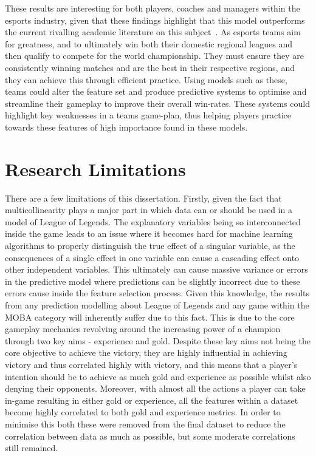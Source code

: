 These results are interesting for both players, coaches and managers within the esports industry, given that these findings highlight that this model outperforms the current rivalling academic literature on this subject~\citep{lee2020predicting, silva2018continuous}.
As esports teams aim for greatness, and to ultimately win both their domestic regional leagues and then qualify to compete for the world championship.
They must ensure they are consistently winning matches and are the best in their respective regions, and they can achieve this through efficient practice.
Using models such as these, teams could alter the feature set and produce predictive systems to optimise and streamline their gameplay to improve their overall win-rates.
These systems could highlight key weaknesses in a teams game-plan, thus helping players practice towards these features of high importance found in these models.

\section{Research Limitations}\label{sec:Research Limitations}

There are a few limitations of this dissertation.
Firstly, given the fact that multicollinearity plays a major part in which data can or should be used in a model of League of Legends.
The explanatory variables being so interconnected inside the game leads to an issue where it becomes hard for machine learning algorithms to properly distinguish the true effect of a singular variable, as the consequences of a single effect in one variable can cause a cascading effect onto other independent variables.
This ultimately can cause massive variance or errors in the predictive model where predictions can be slightly incorrect due to these errors cause inside the feature selection process.
Given this knowledge, the results from any prediction modelling about League of Legends and any game within the MOBA category will inherently suffer due to this fact.
This is due to the core gameplay mechanics revolving around the increasing power of a champion through two key aims - experience and gold.
Despite these key aims not being the core objective to achieve the victory, they are highly influential in achieving victory and thus correlated highly with victory, and this means that a player's intention should be to achieve as much gold and experience as possible whilst also denying their opponents.
Moreover, with almost all the actions a player can take in-game resulting in either gold or experience, all the features within a dataset become highly correlated to both gold and experience metrics.
In order to minimise this both these were removed from the final dataset to reduce the correlation between data as much as possible, but some moderate correlations still remained. \\

